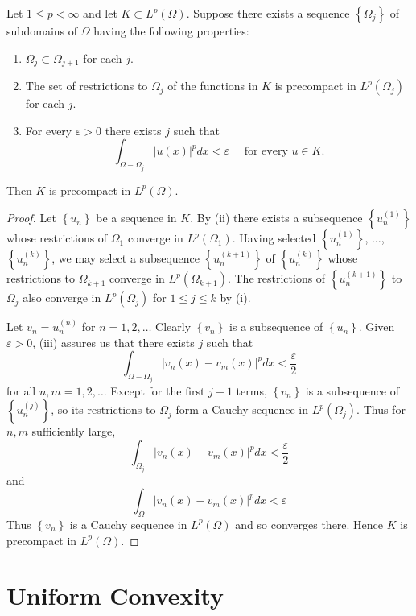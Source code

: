 \begin{theorem}
  Let $1 \leq p<\infty$ and let $K \subset L^p(\Omega)$. Suppose there exists a sequence $\left\{\Omega_j\right\}$ of subdomains of $\Omega$ having the following properties:
  \begin{enumerate}[label = (\roman*)]
    \item $\Omega_j \subset \Omega_{j+1}$ for each $j$.
    \item The set of restrictions to $\Omega_j$ of the functions in $K$ is precompact in $L^p\left(\Omega_j\right)$ for each $j$.
    \item For every $\varepsilon>0$ there exists $j$ such that
    \[
    \int_{\Omega-\Omega_j}|u(x)|^p d x<\varepsilon \quad \text { for every } u \in K.
    \]
  \end{enumerate}
  Then $K$ is precompact in $L^p(\Omega)$.
\end{theorem}

\begin{proof}
  Let $\left\{u_n\right\}$ be a sequence in $K$.
  By (ii) there exists a subsequence $\left\{u_n^{(1)}\right\}$ whose restrictions
  of $\Omega_1$ converge in $L^p\left(\Omega_1\right)$.
  Having selected $\left\{u_n^{(1)}\right\}$, $\ldots$, $\left\{u_n^{(k)}\right\}$,
  we may select a subsequence $\left\{u_n^{(k+1)}\right\}$ of $\left\{u_n^{(k)}\right\}$
  whose restrictions to $\Omega_{k+1}$ converge in $L^p\left(\Omega_{k+1}\right)$.
  The restrictions of $\left\{u_n^{(k+1)}\right\}$ to $\Omega_j$ also converge
  in $L^p\left(\Omega_j\right)$ for $1 \leq j \leq k$ by (i).
  
  Let $v_n=u_n^{(n)}$ for $n=1,2, \ldots$ Clearly $\left\{v_n\right\}$ is a subsequence
  of $\left\{u_n\right\}$. Given $\varepsilon>0$, (iii) assures us that there exists $j$ such that
  \[
  \int_{\Omega-\Omega_j}\left|v_n(x)-v_m(x)\right|^p d x<\frac{\varepsilon}{2}
  \]
  for all $n, m=1,2, \ldots$ Except for the first $j-1$ terms, $\left\{v_n\right\}$
  is a subsequence of $\left\{u_n^{(j)}\right\}$, so its restrictions to $\Omega_j$
  form a Cauchy sequence in $L^p\left(\Omega_j\right)$. Thus for $n, m$ sufficiently large,
  \[
  \int_{\Omega_j}\left|v_n(x)-v_m(x)\right|^p d x<\frac{\varepsilon}{2}
  \]
  and
  \[
  \int_{\Omega}\left|v_n(x)-v_m(x)\right|^p d x<\varepsilon
  \]
  Thus $\left\{v_n\right\}$ is a Cauchy sequence in $L^p(\Omega)$ and so converges there.
  Hence $K$ is precompact in $L^p(\Omega)$.
\end{proof}


\section{Uniform Convexity}

